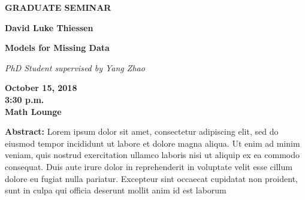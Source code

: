 \documentclass[12pt]{article}
\begin{document}
\begin{center}
\sffamily
\Huge\textbf{GRADUATE SEMINAR}

\bigskip
\LARGE\textbf{David Luke Thiessen}

\bigskip
\textbf{Models for Missing Data}

\bigskip
\large
\textit{PhD Student supervised by Yang Zhao}

\Large
\bigskip
\textbf{October 15, 2018
\\3:30 p.m.
\\Math Lounge
}
\end{center}

\bigskip

\sffamily\large\noindent\textbf{Abstract:} 
Lorem ipsum dolor sit amet, consectetur adipiscing elit, sed do eiusmod tempor incididunt ut labore et dolore magna aliqua. Ut enim ad minim veniam, quis nostrud exercitation ullamco laboris nisi ut aliquip ex ea commodo consequat. Duis aute irure dolor in reprehenderit in voluptate velit esse cillum dolore eu fugiat nulla pariatur. Excepteur sint occaecat cupidatat non proident, sunt in culpa qui officia deserunt mollit anim id est laborum


 
\end{document}
